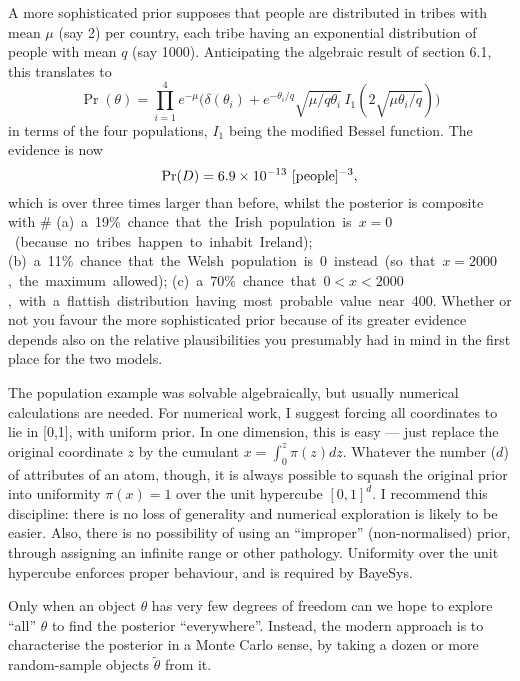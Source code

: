 A more sophisticated prior supposes that people are distributed in tribes with mean $\mu$ (say 2) per country,
each tribe having an exponential distribution of people with mean $q$ (say 1000).
Anticipating the algebraic result of section 6.1, this translates to
$$
 \Pr(\theta) = \prod_{i=1}^4 e^{-\mu} \big( \delta(\theta_i) + e^{-\theta_i/q} \sqrt{\mu / q \theta_i} \,I_1(2\sqrt{\mu \theta_i / q})\big)
$$
in terms of the four populations, $I_1$ being the modified Bessel function.
The evidence is now
$$
 \Pr(D) = 6.9\times 10^{-13}\ [{\rm people}]^{-3}, 
$$
which is over three times larger than before, whilst the posterior is composite with
\halign
{\quad  #                                                                                                    \hfill \cr
\hbox{(a) a 19\% chance that the Irish population is $x=0$ (because no tribes happen to inhabit Ireland);}   \cr
\hbox{(b) a 11\% chance that the Welsh population is  0 instead (so that $x = 2000$, the maximum allowed);}  \cr
\hbox{(c) a 70\% chance that $0 < x < 2000$, with a flattish distribution having most probable value near 400.}\cr
}
\noindent Whether or not you favour the more sophisticated prior because of its greater evidence 
depends also on the relative plausibilities you presumably had in mind in the first place for the two models.

\hfill\eject
The population example was solvable algebraically, but usually numerical calculations are needed.
For numerical work, I suggest forcing all coordinates to lie in [0,1], with uniform prior.
In one dimension, this is easy --- just replace the original coordinate $z$ by the cumulant $x = \int_0^z \pi(z) dz$.
Whatever the number ($d$) of attributes of an atom, though,
it is always possible to squash the original prior into uniformity $\pi(x) = 1$ over the unit hypercube $[0,1]^d$.
I recommend this discipline: there is no loss of generality and numerical exploration is likely to be easier.
Also, there is no possibility of using an ``improper'' (non-normalised) prior, through assigning an infinite range or other pathology.
Uniformity over the unit hypercube enforces proper behaviour, and is required by BayeSys.

\bigskip
{}
\smallskip

Only when an object $\theta$ has very few degrees of freedom can we hope to explore ``all'' $\theta$ to find the posterior ``everywhere''. 
Instead, the modern approach is to characterise the posterior in a Monte Carlo sense, by taking a dozen or more random-sample objects $\tilde\theta$ from it.

